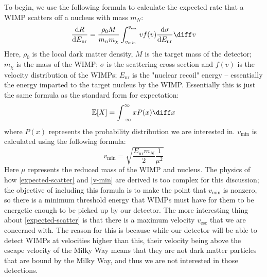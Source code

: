 To begin, we use the following formula to calculate the expected rate that a WIMP scatters off a nucleus with
mass \( m_N \):
\begin{equation}
	\label{expected-scatter}
	\dv{R}{E_\text{nr}} = \frac{\rho_0 M}{m_n m_{\chi}} \int_{v_\text{min}}^{v_\text{esc}} v f(v)
	\dv{\sigma}{E_\text{nr}} \diff v
\end{equation}
Here, \( \rho_0 \) is the local dark matter density, \( M \) is the target mass of the detector; \(
m_{\chi} \) is the mass of the WIMP; \( \sigma \) is the scattering cross section and \( f(v) \) is the
velocity distribution of the WIMPs; \( E_\text{nr} \) is the "nuclear recoil" energy -- essentially the
energy imparted to the target nucleus by the WIMP. Essentially this is just the same formula as the standard
form for expectation:
\[
	\mathbb E[X] = \int_{-\infty}^{\infty} x P(x) \diff x
\]
where \( P(x) \) represents the probability distribution we are interested in. \( v_\text{min} \) is
calculated using the following formula:
\begin{equation}
	\label{v-min}
	v_\text{min} = \sqrt{\frac{E_\text{nr}m_N}{2} \frac{1}{\mu^2}}
\end{equation}
Here \( \mu \) represents the reduced mass of the WIMP and nucleus. The physics of how \cref{expected-scatter} and
\cref{v-min} are derived is too complex for this discussion; the objective of including
this formula is to make the point that \( v_\text{min} \) is nonzero, so there is a minimum threshold energy
that WIMPs must have for them to be energetic enough to be picked up by our detector. The more interesting
thing about \cref{expected-scatter} is that there is a maximum velocity \( v_\text{esc} \) that we
are concerned with. The reason for this is because while our detector will be able to detect WIMPs at
velocities higher than this, their velocity being above the escape velocity of the Milky Way means that they
are not dark matter particles that are bound by the Milky Way, and thus we are not interested in those
detections.  


